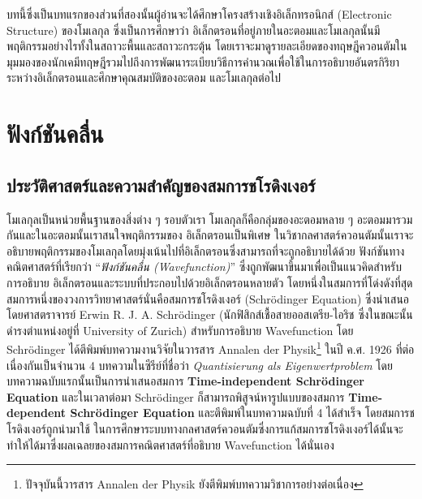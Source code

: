 บทนี้ซึ่งเป็นบทแรกของส่วนที่สองนั้นผู้อ่านจะได้ศึกษาโครงสร้างเชิงอิเล็กทรอนิกส์ (Electronic Structure) ของโมเลกุล ซึ่งเป็นการศึกษาว่า%
อิเล็กตรอนที่อยู่ภายในอะตอมและโมเลกุลนั้นมีพฤติกรรมอย่างไรทั้งในสถาวะพื้นและสถาวะกระตุ้น โดยเราจะมาดูรายละเอียดของทฤษฎีควอนตัมใน%
มุมมองของนักเคมีทฤษฎีรวมไปถึงการพัฒนาระเบียบวิธีการคำนวณเพื่อใช้ในการอธิบายอันตรกิริยาระหว่างอิเล็กตรอนและศึกษาคุณสมบัติของอะตอม%
และโมเลกุลต่อไป

\section{ฟังก์ชันคลื่น}
\label{sec:wavefunction}

\subsection{ประวัติศาสตร์และความสำคัญของสมการชโรดิงเงอร์}
\label{ssec:schrodinger_eq}

โมเลกุลเป็นหน่วยพื้นฐานของสิ่งต่าง ๆ รอบตัวเรา โมเลกุลก็คือกลุ่มของอะตอมหลาย ๆ อะตอมมารวมกันและในอะตอมนั้นเราสนใจพฤติกรรมของ%
อิเล็กตรอนเป็นพิเศษ ในวิชากลศาสตร์ควอนตัมนั้นเราจะอธิบายพฤติกรรมของโมเลกุลโดยมุ่งเน้นไปที่อิเล็กตรอนซึ่งสามารถที่จะถูกอธิบายได้ด้วย%
ฟังก์ชันทางคณิตศาสตร์ที่เรียกว่า \enquote{\textit{ฟังก์ชันคลื่น (Wavefunction)}} ซึ่งถูกพัฒนาขึ้นมาเพื่อเป็นแนวคิดสำหรับการอธิบาย%
อิเล็กตรอนและระบบที่ประกอบไปด้วยอิเล็กตรอนหลายตัว โดยหนึ่งในสมการที่โด่งดังที่สุดสมการหนึ่งของวงการวิทยาศาสตร์นั่นคือสมการชโรดิงเงอร์ 
(Schr\"{o}dinger Equation)\autocite{schleich2013} ซึ่งนำเสนอโดยศาสตราจารย์ Erwin R. J. A. Schr\"{o}dinger 
(นักฟิสิกส์เชื้อสายออสเตรีย-ไอริช ซึ่งในขณะนั้นดำรงตำแหน่งอยู่ที่ University of Zurich) สำหรับการอธิบาย Wavefunction 
โดย Schr\"{o}dinger ได้ตีพิมพ์บทความงานวิจัยในวารสาร Annalen der Physik\footnote{ปัจจุบันนี้วารสาร Annalen der Physik 
ยังตีพิมพ์บทความวิชาการอย่างต่อเนื่อง} ในปี ค.ศ. 1926 ที่ต่อเนื่องกันเป็นจำนวน 4 บทความในซีรีย์ที่ชื่อว่า \textit{Quantisierung als 
Eigenwertproblem} โดยบทความฉบับแรกนั้นเป็นการนำเสนอสมการ \textbf{Time-independent Schr\"{o}dinger Equation}%
\autocite{schrodinger1926} และในเวลาต่อมา Schr\"{o}dinger ก็สามารถพิสูจน์หารูปแบบของสมการ \textbf{Time-dependent 
Schr\"{o}dinger Equation} และตีพิมพ์ในบทความฉบับที่ 4 ได้สำเร็จ\autocite{schrodinger1926a} โดยสมการชโรดิงเงอร์ถูกนำมาใช้%
ในการศึกษาระบบทางกลศาสตร์ควอนตัมซึ่งการแก้สมการชโรดิงเงอร์ได้นั้นจะทำให้ได้มาซึ่งผลเฉลยของสมการคณิตศาสตร์ที่อธิบาย Wavefunction 
ได้นั่นเอง

